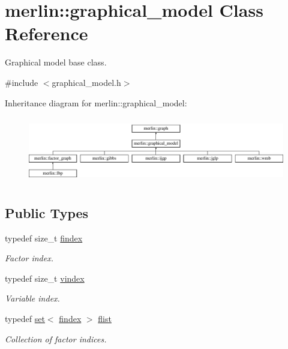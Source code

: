 \hypertarget{classmerlin_1_1graphical__model}{}\section{merlin\+:\+:graphical\+\_\+model Class Reference}
\label{classmerlin_1_1graphical__model}


Graphical model base class.  




{\ttfamily \#include $<$graphical\+\_\+model.\+h$>$}

Inheritance diagram for merlin\+:\+:graphical\+\_\+model\+:\begin{figure}[H]
\begin{center}
\leavevmode
\includegraphics[height=2.928105cm]{classmerlin_1_1graphical__model}
\end{center}
\end{figure}
\subsection*{Public Types}
\begin{DoxyCompactItemize}
\item 
\hypertarget{classmerlin_1_1graphical__model_ab2b46f09d8142bb68f243ecadbdabb6b}{}typedef size\+\_\+t \hyperlink{classmerlin_1_1graphical__model_ab2b46f09d8142bb68f243ecadbdabb6b}{findex}\label{classmerlin_1_1graphical__model_ab2b46f09d8142bb68f243ecadbdabb6b}

\begin{DoxyCompactList}\small\item\em Factor index. \end{DoxyCompactList}\item 
\hypertarget{classmerlin_1_1graphical__model_a275006a490bc09239c12a4d93d53b135}{}typedef size\+\_\+t \hyperlink{classmerlin_1_1graphical__model_a275006a490bc09239c12a4d93d53b135}{vindex}\label{classmerlin_1_1graphical__model_a275006a490bc09239c12a4d93d53b135}

\begin{DoxyCompactList}\small\item\em Variable index. \end{DoxyCompactList}\item 
\hypertarget{classmerlin_1_1graphical__model_a615e25ec6594615fddfd4c3c4776b99f}{}typedef \hyperlink{classmerlin_1_1set}{set}$<$ \hyperlink{classmerlin_1_1graphical__model_ab2b46f09d8142bb68f243ecadbdabb6b}{findex} $>$ \hyperlink{classmerlin_1_1graphical__model_a615e25ec6594615fddfd4c3c4776b99f}{flist}\label{classmerlin_1_1graphical__model_a615e25ec6594615fddfd4c3c4776b99f}

\begin{DoxyCompactList}\small\item\em Collection of factor indices. \end{DoxyCompactList}\end{DoxyCompactItemize}
